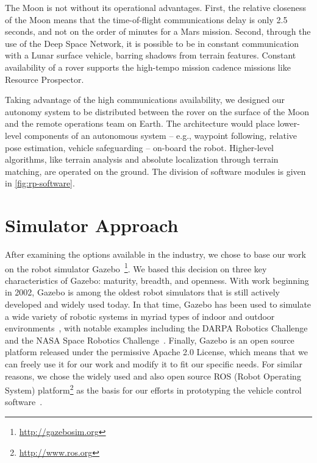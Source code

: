 \documentclass[twocolumn,letterpaper]{IEEEAerospaceCLS}  %
\begin{document}
The Moon is not without its operational advantages.
First, the relative closeness of the Moon means that the time-of-flight communications delay is only 2.5 seconds, and not on the order of minutes for a Mars mission.  
Second, through the use of the Deep Space Network, it is possible to be in constant communication with a Lunar surface vehicle, barring shadows from terrain features.  
Constant availability of a rover supports the high-tempo mission cadence missions like Resource Prospector.

Taking advantage of the high communications availability, we designed our autonomy system to be distributed between the rover on the surface of the Moon and the remote operations team on Earth.  
The architecture would place lower-level components of an autonomous system -- e.g., waypoint following, relative pose estimation, vehicle safeguarding -- on-board the robot.
Higher-level algorithms, like terrain analysis and absolute localization through terrain matching, are operated on the ground.
The division of software modules is given in \cref{fig:rp-software}.


\section{Simulator Approach}
\label{sec:sim-approach}

After examining the options available in the industry, we chose to base our work on the robot simulator Gazebo~\cite{koenig2004design}\footnote{\url{http://gazebosim.org}}.
We based this decision on three key characteristics of Gazebo: maturity, breadth, and openness.
With work beginning in 2002, Gazebo is among the oldest robot simulators that is still actively developed and widely used today.
In that time, Gazebo has been used to simulate a wide variety of robotic systems in myriad types of indoor and outdoor environments~\cite{paepcke2016gazebo}, with notable examples including the DARPA Robotics Challenge~\cite{aguero2015inside} and the NASA Space Robotics Challenge~\cite{hambuchen2017nasa}.
Finally, Gazebo is an open source platform released under the permissive Apache 2.0 License, which means that we can freely use it for our work and modify it to fit our specific needs.
For similar reasons, we chose the widely used and also open source ROS (Robot Operating System) platform\footnote{\url{http://www.ros.org}} as the basis for our efforts in prototyping the vehicle control software~\cite{quigley2009ros}.
\end{document}
